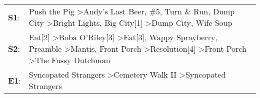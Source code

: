 \begin{supertabular}{p{0.03\textwidth}p{0.92\textwidth}}
 \textbf{S1}:  &                                                                                                               Push the Pig\textsuperscript{} \textgreater \enspace Andy's Last Beer\textsuperscript{}, \enspace \#5\textsuperscript{}, \enspace Turn \& Run\textsuperscript{}, \enspace Dump City\textsuperscript{} \textgreater \enspace Bright Lights, Big City[1]\textsuperscript{} \textgreater \enspace Dump City\textsuperscript{}, \enspace Wife Soup\textsuperscript{}  \enspace  \\
 \textbf{S2}:  &  Eat[2]\textsuperscript{} \textgreater \enspace Baba O'Riley[3]\textsuperscript{} \textgreater \enspace Eat[3]\textsuperscript{}, \enspace Wappy Sprayberry\textsuperscript{}, \enspace Preamble\textsuperscript{} \textgreater \enspace Mantis\textsuperscript{}, \enspace Front Porch\textsuperscript{} \textgreater \enspace Resolution[4]\textsuperscript{} \textgreater \enspace Front Porch\textsuperscript{} \textgreater \enspace The Fussy Dutchman\textsuperscript{}  \enspace  \\
 \textbf{E1}:  &                                                                                                                                                                                                                                                                                                                   Syncopated Strangers\textsuperscript{} \textgreater \enspace Cemetery Walk II\textsuperscript{} \textgreater \enspace Syncopated Strangers\textsuperscript{}  \enspace  \\
\end{supertabular}
